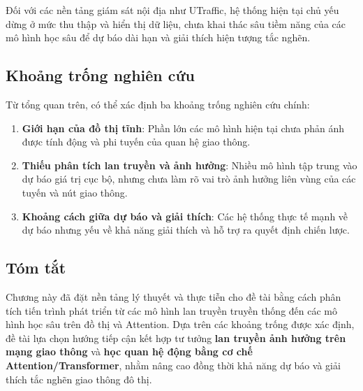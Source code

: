 Đối với các nền tảng giám sát nội địa như UTraffic, hệ thống hiện tại chủ yếu dừng ở mức thu thập và hiển thị dữ liệu, chưa khai thác sâu tiềm năng của các mô hình học sâu để dự báo dài hạn và giải thích hiện tượng tắc nghẽn.

\subsection{Khoảng trống nghiên cứu}

Từ tổng quan trên, có thể xác định ba khoảng trống nghiên cứu chính:

\begin{enumerate}
    \item \textbf{Giới hạn của đồ thị tĩnh}: Phần lớn các mô hình hiện tại chưa phản ánh được tính động và phi tuyến của quan hệ giao thông.
    \item \textbf{Thiếu phân tích lan truyền và ảnh hưởng}: Nhiều mô hình tập trung vào dự báo giá trị cục bộ, nhưng chưa làm rõ vai trò ảnh hưởng liên vùng của các tuyến và nút giao thông.
    \item \textbf{Khoảng cách giữa dự báo và giải thích}: Các hệ thống thực tế mạnh về dự báo nhưng yếu về khả năng giải thích và hỗ trợ ra quyết định chiến lược.
\end{enumerate}

\newpage
\subsection*{Tóm tắt}

Chương này đã đặt nền tảng lý thuyết và thực tiễn cho đề tài bằng cách phân tích tiến trình phát triển từ các mô hình lan truyền truyền thống đến các mô hình học sâu trên đồ thị và Attention. Dựa trên các khoảng trống được xác định, đề tài lựa chọn hướng tiếp cận kết hợp tư tưởng \textbf{lan truyền ảnh hưởng trên mạng giao thông} và \textbf{học quan hệ động bằng cơ chế Attention/Transformer}, nhằm nâng cao đồng thời khả năng dự báo và giải thích tắc nghẽn giao thông đô thị.
